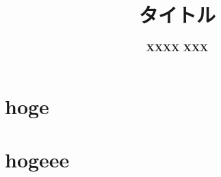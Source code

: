 \documentclass[10.5pt,twocolumn,a4j,fleqn]{ujarticle}
\title{
  {\Large{\bf タイトル }}
}
\author{\bf{XXXX XXX}\\
}
\date{}
\begin{document}
\maketitle

\section{hoge}\label{sec1}
\section{hogeee}\label{sec2}


\begin{thebibliography}{99}
\end{thebibliography}
\end{document}
